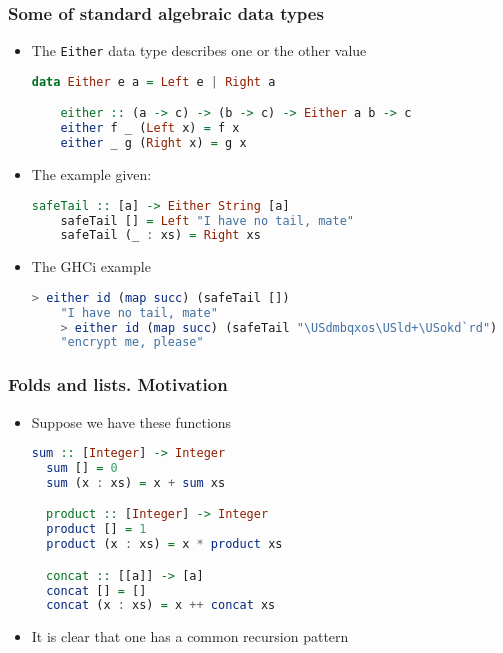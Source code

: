 \documentclass[10pt,pdf,utf8,russian,aspectratio=169]{beamer}
\begin{document}
\begin{frame}[fragile]
  \frametitle{Some of standard algebraic data types}
  \begin{itemize}
    \item The \verb"Either" data type describes one or the other value

    \begin{lstlisting}[language=Haskell]
    data Either e a = Left e | Right a

    either :: (a -> c) -> (b -> c) -> Either a b -> c
    either f _ (Left x) = f x
    either _ g (Right x) = g x
    \end{lstlisting}
    \item The example given:
    \begin{lstlisting}[language=Haskell]
    safeTail :: [a] -> Either String [a]
    safeTail [] = Left "I have no tail, mate"
    safeTail (_ : xs) = Right xs
    \end{lstlisting}
    \item The GHCi example
    \begin{lstlisting}[language=Haskell]
    > either id (map succ) (safeTail [])
    "I have no tail, mate"
    > either id (map succ) (safeTail "\USdmbqxos\USld+\USokd`rd")
    "encrypt me, please"
    \end{lstlisting}
  \end{itemize}
\end{frame}

\begin{frame}[fragile]
  \frametitle{Folds and lists. Motivation}

\begin{itemize}
  \item Suppose we have these functions
  \begin{lstlisting}[language=Haskell]
  sum :: [Integer] -> Integer
  sum [] = 0
  sum (x : xs) = x + sum xs

  product :: [Integer] -> Integer
  product [] = 1
  product (x : xs) = x * product xs

  concat :: [[a]] -> [a]
  concat [] = []
  concat (x : xs) = x ++ concat xs
  \end{lstlisting}
  \item It is clear that one has a common recursion pattern
\end{itemize}
\end{frame}
\end{document}
